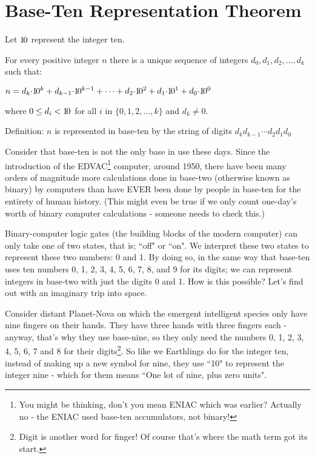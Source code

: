 \documentclass{article}
\newenvironment{jprIn}{\begin{adjustwidth}{2em}{}}{\end{adjustwidth}}
\begin{document}
\section*{Base-Ten Representation Theorem}
\begin{jprIn}
Let ${1\hspace{-0.12em}0}$ represent the integer ten.

For every positive integer $n$ there is a unique
sequence of integers $d_0, d_1, d_2,\dots{},d_k$ such that:

\hspace{3em}$n=d_k{\cdot}{1\hspace{-0.12em}0}^k+d_{k-1}{\cdot}{1\hspace{-0.12em}0}^{k-1}+\dots+d_2{\cdot}{1\hspace{-0.12em}0}^2+d_1{\cdot}{1\hspace{-0.12em}0}^1+d_0{\cdot}{1\hspace{-0.12em}0}^0$

where $0\le{}d_i<{1\hspace{-0.12em}0}$ for all $i$ in $\{0,1,2,\dots{},k\}$ and $d_k\ne0$.

Definition: $n$ is represented in base-ten by the string of digits $d_kd_{k-1}{\cdots}d_2d_1d_0$
\end{jprIn}

\bigskip
Consider that base-ten is not the only base in use these days.
Since the introduction of the EDVAC\footnote{You might be thinking, don't you
mean ENIAC which was earlier? Actually no - the ENIAC
used base-ten accumulators, not binary!} computer, around 1950,
there have been many orders of magnitude more calculations done
in base-two (otherwise known as binary) by computers than have EVER
been done by people in base-ten for the entirety of human history.
(This might even be true if we only count one-day's worth of
binary computer calculations - someone needs to check this.)

Binary-computer logic gates (the building blocks of the modern computer)
can only take one of two states, that is; ``off" or ``on".
We interpret these two states to represent these two numbers: 0 and 1.
By doing so, in the same way that base-ten uses ten numbers 0,
1, 2, 3, 4, 5, 6, 7, 8, and 9 for its digits; we can represent integers
in base-two with just the digits 0 and 1. How is this possible?
Let's find out with an imaginary trip into space.

Consider distant Planet-Nova on which the emergent
intelligent species only have nine fingers on their hands.
They have three hands with three fingers each - anyway,
that's why they use base-nine, so they only need the numbers 0,
1, 2, 3, 4, 5, 6, 7 and 8 for their digits\footnote{Digit
is another word for finger! Of course that's where the math term got its start.}.
So like we Earthlings do for the integer ten,
instead of making up a new symbol for nine,
they use ``10" to represent the integer nine - which
for them means ``One lot of nine, plus zero units".
\end{document}
